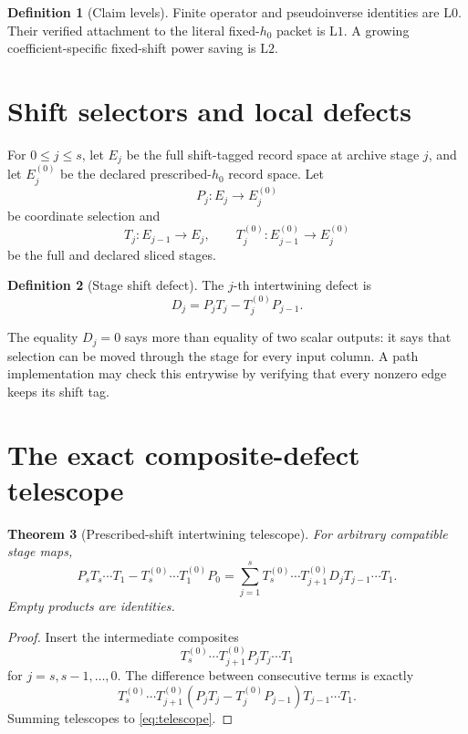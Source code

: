 \documentclass[11pt]{article}
\newtheorem{theorem}{Theorem}[section]
\theoremstyle{definition}
\newtheorem{definition}[theorem]{Definition}
\theoremstyle{remark}
\newcommand{\Lzero}{\mathrm{L0}}
\newcommand{\Lone}{\mathrm{L1}}
\newcommand{\Ltwo}{\mathrm{L2}}
\begin{document}
\begin{definition}[Claim levels]
Finite operator and pseudoinverse identities are \(\Lzero\).  Their
verified attachment to the literal fixed-\(h_0\) packet is \(\Lone\).
A growing coefficient-specific fixed-shift power saving is \(\Ltwo\).
\end{definition}

\section{Shift selectors and local defects}

For \(0\le j\le s\), let \(E_j\) be the full shift-tagged record space
at archive stage \(j\), and let \(E_j^{(0)}\) be the declared
prescribed-\(h_0\) record space.  Let
\[
 P_j:E_j\to E_j^{(0)}
\]
be coordinate selection and
\[
 T_j:E_{j-1}\to E_j,\qquad
 T_j^{(0)}:E_{j-1}^{(0)}\to E_j^{(0)}
\]
be the full and declared sliced stages.

\begin{definition}[Stage shift defect]
The \(j\)-th intertwining defect is
\begin{equation}
 D_j=P_jT_j-T_j^{(0)}P_{j-1}.
 \label{eq:Dj}
\end{equation}
\end{definition}

The equality \(D_j=0\) says more than equality of two scalar outputs:
it says that selection can be moved through the stage for every input
column.  A path implementation may check this entrywise by verifying
that every nonzero edge keeps its shift tag.

\section{The exact composite-defect telescope}

\begin{theorem}[Prescribed-shift intertwining telescope]
\label{thm:telescope}
For arbitrary compatible stage maps,
\begin{equation}
\boxed{
 P_sT_s\cdots T_1
 -
 T_s^{(0)}\cdots T_1^{(0)}P_0
 =
 \sum_{j=1}^s
 T_s^{(0)}\cdots T_{j+1}^{(0)}
 D_j
 T_{j-1}\cdots T_1.}
\label{eq:telescope}
\end{equation}
Empty products are identities.
\end{theorem}

\begin{proof}
Insert the intermediate composites
\[
 T_s^{(0)}\cdots T_{j+1}^{(0)}
 P_jT_j\cdots T_1
\]
for \(j=s,s-1,\ldots,0\).  The difference between consecutive terms
is exactly
\[
 T_s^{(0)}\cdots T_{j+1}^{(0)}
 (P_jT_j-T_j^{(0)}P_{j-1})
 T_{j-1}\cdots T_1.
\]
Summing telescopes to \eqref{eq:telescope}.
\end{proof}
\end{document}
